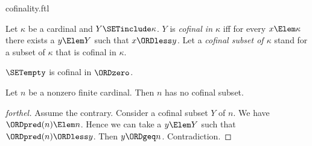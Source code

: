 \documentclass{stex}
\begin{document}
\begin{smodule}{cofinality.ftl}

\begin{definition}[forthel,for={cofinal,cofinal subset}]
  Let $\kappa$ be a cardinal and $Y \SETinclude \kappa$.
  $Y$ is \emph{cofinal in $\kappa$} iff for every $x \Elem \kappa$ there exists a $y \Elem Y$ such that $x \ORDless y$.
  Let a \emph{cofinal subset of $\kappa$} stand for a subset of $\kappa$ that is cofinal in $\kappa$.
\end{definition}

\begin{proposition}[forthel]
  $\SETempty$ is cofinal in $\ORDzero$.
\end{proposition}

\begin{proposition}[forthel]
  Let $n$ be a nonzero finite cardinal.
  Then $n$ has no cofinal subset.
\end{proposition}
\begin{proof}[forthel]
  Assume the contrary.
  Consider a cofinal subset $Y$ of $n$.
  We have $\ORDpred(n) \Elem n$.
  Hence we can take a $y \Elem Y$ such that $\ORDpred(n) \ORDless y$.
  Then $y \ORDgeq n$.
  Contradiction.
\end{proof}
\end{smodule}
\end{document}
